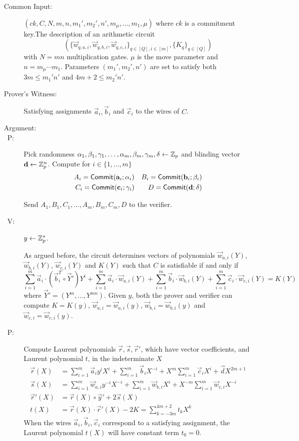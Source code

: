 \begin{description}
\item[Common Input:] $(ck,C,N,m,n,m_1',m_2',n',m_\mu,\ldots, m_1, \mu)$ where $ck$ is a commitment key.The description of an arithmetic circuit $$\left( \{\vec{w}_{q,{a,i}},\vec{w}_{q,{b,i}},\vec{w}_{q,{c,i}}\}_{q \in [Q], i \in [m]},\{K_{q}\}_{q \in [Q]}\right)$$ with $N=mn$ multiplication gates. $\mu$ is the move parameter and $n=m_\mu \cdots m_1$. Parameters $(m_1',m_2',n')$ are set to  satisfy both 
$3m \leq m_1' n'$ and $4m+2 \leq m_2' n'$.

\item[Prover's Witness:] Satisfying assignments $\vec{a}_{i},\vec{b}_i$ and $\vec{c}_i$ to the wires of $C$.
\item[Argument:]
\item[\ P:]
Pick randomness $\alpha_1,\beta_1,\gamma_1,\ldots,\alpha_m,\beta_m,\gamma_m,\delta\gets \mathbb{Z}_p$ and blinding vector $\mathbf{d} \gets \mathbb{Z}_p^n$. Compute for $i \in \{1,\ldots,m\}$
\begin{align*}
{A}_{i}=\mathsf{Commit}(\mathbf{a}_{i};\alpha_{i}) && {B}_{i}=\mathsf{Commit}(\mathbf{b}_{i};\beta_{i}) \\
{C}_{i}=\mathsf{Commit}(\mathbf{c}_{i};\gamma_{i}) && {D}=\mathsf{Commit}(\mathbf{d};\delta)
\end{align*}

Send $A_{1},B_{1},C_{1},\ldots,A_{m},B_{m},C_{m},D$ to the verifier.

\item[\ V:] $y\gets \mathbb{Z}_p^*$.

As argued before, the circuit determines vectors of polynomials $\vec{w}_{a,i}(Y)$, $\vec{w}_{b,i}(Y)$, $\vec{w}_{c,i}(Y)$ and $K(Y)$ such that $C$ is satisfiable if and only if 
%
$$
%
\sum_{i=1}^m  \vec{a}_i  \cdot (\vec{b}_i^T \circ \vec{Y}') Y^i+\sum_{i=1}^m \vec{a}_i  \cdot \vec{w}_{a,i}(Y)
+
\sum_{i=1}^m \vec{b}_i \cdot \vec{w}_{b,i}(Y)   +\sum_{i=1}^m \vec{c}_i \cdot \vec{w}_{c,i}(Y) =  K(Y)
$$
 where $\vec{Y}'=(Y^m,\ldots,Y^{mn})$. Given $y$, both the prover and verifier can compute $K=K(y)$, $\vec{w}_{a,i}=\vec{w}_{a,i}(y)$, $\vec{w}_{b,i}=\vec{w}_{b,i}(y)$ and $\vec{w}_{c,i}=\vec{w}_{c,i}(y)$. 

\item[\ P:] Compute Laurent polynomials $\vec{r},\vec{s},\vec{r}'$, which have vector coefficients, and Laurent polynomial $t$, in the indeterminate $X$ 
\begin{align*}
\vec{r}(X)&=\sum_{i=1}^m\vec{a}_{i}y^i X^{i}+\sum_{i=1}^m\vec{b}_{i} X^{-i}+X^m \sum_{i=1}^m\vec{c}_{i} X^{i}+\vec{d}X^{2m+1}\\
\vec{s}(X)&=\sum_{i=1}^m\vec{w}_{a,i}y^{-i} X^{-i}+\sum_{i=1}^m\vec{w}_{b,i}X^{i}+ X^{-m} \sum_{i=1}^m\vec{w}_{c,i}X^{-i}\\
\vec{r}'(X)&= \vec{r}(X) \circ \vec{y}' + 2\vec{s}(X)\\
 t(X)&=\vec{r}(X)\cdot \vec{r}'(X)-2K=\sum_{k=-3m}^{4m+2}t_kX^{k}
\end{align*}
When the wires $\vec{a}_{i},\vec{b}_i,\vec{c}_i$ correspond to a satisfying assignment, the Laurent polynomial $t(X)$ will have constant term $t_0=0$. 


\end{description}
